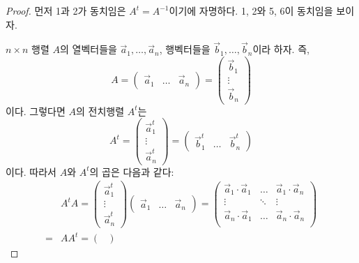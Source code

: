 \documentclass[../engineering_mathematics_lecture_note.tex]{subfiles}
\begin{document}
\begin{proof}
    먼저 1과 2가 동치임은 $A^t = A^{-1}$이기에 자명하다.
    1, 2와 5, 6이 동치임을 보이자.

    $n \times n$ 행렬 $A$의 열벡터들을 $\vec a_1, \dots, \vec a_n$, 행벡터들을 $\vec b_1, \dots, \vec b_n$이라 하자.
    즉,
    \begin{equation*}
        A =
        \begin{pmatrix}
            \vec a_1 & \dots & \vec a_n
        \end{pmatrix}
        =
        \begin{pmatrix}
            \vec b_1 \\ \vdots \\ \vec b_n
        \end{pmatrix}
    \end{equation*}
    이다.
    그렇다면 $A$의 전치행렬 $A^t$는
    \begin{equation*}
        A^t =
        \begin{pmatrix}
            \vec a_1^t \\ \vdots \\ \vec a_n^t
        \end{pmatrix}
        =
        \begin{pmatrix}
            \vec b_1^t & \dots & \vec b_n^t
        \end{pmatrix}
    \end{equation*}
    이다.
    따라서 $A$와 $A^t$의 곱은 다음과 같다:
    \begin{align*}
        &A^tA =
        \begin{pmatrix}
            \vec a_1^t \\ \vdots \\ \vec a_n^t
        \end{pmatrix}
        \begin{pmatrix}
            \vec a_1 & \dots & \vec a_n
        \end{pmatrix}
        =
        \begin{pmatrix}
            \vec a_1 \cdot \vec a_1 & \dots & \vec a_1 \cdot \vec a_n\\
            \vdots & \ddots & \vdots\\
            \vec a_n \cdot \vec a_1 & \dots & \vec a_n \cdot \vec a_n\\
        \end{pmatrix}
        \\
        = &AA^t =
        \begin{pmatrix}

\end{pmatrix}
\end{align*}
\end{proof}
\end{document}
